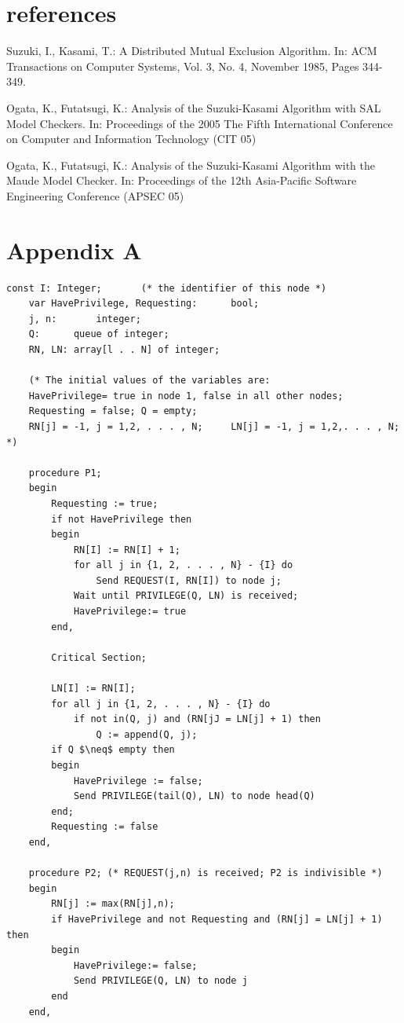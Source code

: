 \documentclass[a4paper,10pt]{llncs}
\begin{document}
\section{references}
\begin{thebibliography}{4}
 Suzuki, I., Kasami, T.: A Distributed Mutual Exclusion Algorithm. In: 
ACM Transactions on Computer Systems, Vol. 3, No. 4, November 1985, Pages 344-349.

Ogata, K., Futatsugi, K.: Analysis of the Suzuki-Kasami Algorithm with SAL Model Checkers. In: 
Proceedings of the 2005 The Fifth International Conference on Computer and Information Technology (CIT 05)

 Ogata, K., Futatsugi, K.: Analysis of the Suzuki-Kasami Algorithm with the Maude Model Checker. In: 
Proceedings of the 12th Asia-Pacific Software Engineering Conference (APSEC 05)




\end{thebibliography}

\newpage
\appendix
\section{Appendix A}
\label{sec:ska}

\begin{lstlisting}[label=some-code,caption=Suzuki and Kasami's algorithm,mathescape]
const I: Integer;		(* the identifier of this node *)
	var HavePrivilege, Requesting:		bool;
	j, n:	 	integer;
	Q: 		queue of integer;
	RN, LN:	array[l . . N] of integer;

	(* The initial values of the variables are:
	HavePrivilege= true in node 1, false in all other nodes;
	Requesting = false; Q = empty;
	RN[j] = -1, j = 1,2, . . . , N;  	LN[j] = -1, j = 1,2,. . . , N; *)

	procedure P1;
	begin
		Requesting := true;
		if not HavePrivilege then
		begin
			RN[I] := RN[I] + 1;
			for all j in {1, 2, . . . , N} - {I} do
				Send REQUEST(I, RN[I]) to node j;
			Wait until PRIVILEGE(Q, LN) is received;
			HavePrivilege:= true
		end,
	
		Critical Section;

		LN[I] := RN[I];
		for all j in {1, 2, . . . , N} - {I} do
			if not in(Q, j) and (RN[jJ = LN[j] + 1) then
				Q := append(Q, j);
		if Q $\neq$ empty then
		begin
			HavePrivilege := false;
			Send PRIVILEGE(tail(Q), LN) to node head(Q)
		end;
		Requesting := false
	end,

	procedure P2; (* REQUEST(j,n) is received; P2 is indivisible *)
	begin
		RN[j] := max(RN[j],n);
		if HavePrivilege and not Requesting and (RN[j] = LN[j] + 1) then
		begin
			HavePrivilege:= false;
			Send PRIVILEGE(Q, LN) to node j
		end
	end,

\end{lstlisting}
\newpage
\end{document}
